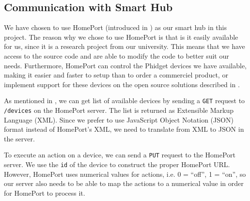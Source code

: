 \subsection{Communication with Smart Hub}\label{sec:designsmarthub}
We have chosen to use HomePort (introduced in ) as our smart hub in this project.
The reason why we chose to use HomePort is that is it easily available for us, 
since it is a research project from our university. 
This means that we have access to the source code and are able to modify the code to better suit our needs.
Furthermore, HomePort can control the Phidget devices we have available, 
making it easier and faster to setup than to order a commerciel product, 
or implement support for these devices on the open source solutions described in . 

As mentioned in , we can get list of available devices by sending a \texttt{GET} request to \texttt{/devices} on the HomePort server. 
The list is returned as Extensible Markup Language (XML). 
Since we prefer to use JavaScript Object Notation (JSON) format instead of HomePort's XML, 
we need to translate from XML to JSON in the server. 

To execute an action on a device, we can send a \texttt{PUT} request to the HomePort server. 
We use the \texttt{id} of the device to construct the proper HomePort URL. 
However, HomePort uses numerical values for actions, i.e. 0 = ``off'', 1 = ``on'', 
so our server also needs to be able to map the actions to a numerical value in order for HomePort to process it. 
